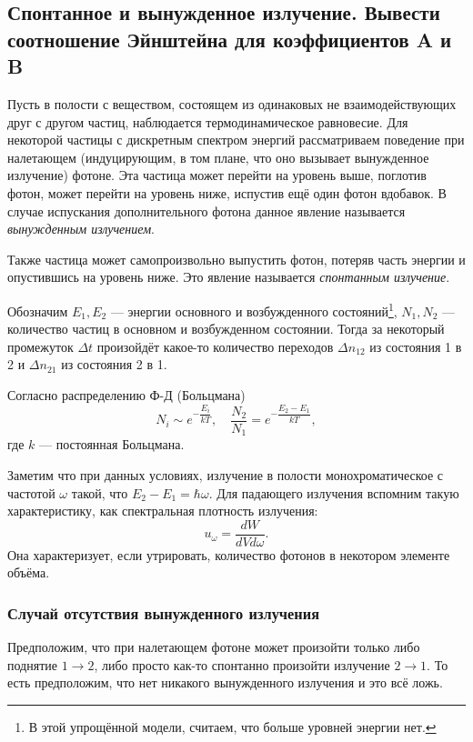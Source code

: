 \subsection{Спонтанное и вынужденное излучение. Вывести соотношение Эйнштейна для
коэффициентов A и B}\label{einstein-a-b}
Пусть в полости с веществом, состоящем из одинаковых не взаимодействующих друг с
другом частиц, наблюдается термодинамическое равновесие. Для некоторой частицы с дискретным спектром энергий рассматриваем поведение при налетающем
(индуцирующим, в том плане, что оно вызывает вынужденное излучение) фотоне. Эта частица может
перейти на уровень выше, поглотив фотон, может перейти на уровень ниже, испустив
ещё один фотон вдобавок.
В случае испускания дополнительного фотона данное явление называется
\emph{вынужденным излучением}.

Также частица может самопроизвольно выпустить фотон, потеряв часть энергии и опустившись на
уровень ниже. Это явление называется \emph{спонтанным излучение}.

Обозначим $E_1, E_2$ --- энергии основного и возбужденного состояний\footnote{В
этой упрощённой модели, считаем, что больше уровней энергии нет.}, $N_1, N_2$ --- количество
частиц в основном и возбужденном состоянии. Тогда за некоторый промежуток $\Delta t$ произойдёт
какое-то количество переходов $\Delta n_{12}$ из состояния 1 в 2 и $\Delta n_{21}$ из
состояния 2 в 1.

Согласно распределению Ф-Д (Больцмана)
\[
  N_i \sim e^{-\dfrac{E_i}{kT}},\quad \frac{N_2}{N_1} = e^{-\dfrac{E_2 - E_1}{kT}},
\]
где $ k $ --- постоянная Больцмана.

Заметим что при данных условиях, излучение в полости монохроматическое с
частотой $ \omega $ такой, что $ E_2 - E_1 = \hbar\omega $. Для падающего излучения вспомним такую характеристику, как спектральная плотность излучения:
\[
  u_\omega = \dfrac{dW}{dV d\omega}.
\]
Она характеризует, если утрировать, количество фотонов в некотором элементе объёма.

\subsubsection{Случай отсутствия вынужденного излучения}
Предположим, что при налетающем фотоне может произойти только либо поднятие $1 \to 2$, 
либо просто как-то спонтанно произойти излучение $2 \to 1$. То есть предположим, что нет никакого
вынужденного излучения и это всё ложь.

